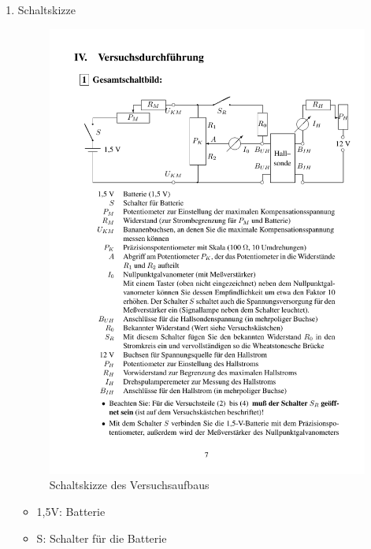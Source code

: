 \documentclass[12pt]{scrartcl}
\begin{document}
\begin{enumerate}
\item Schaltskizze \newline

\begin{figure}[htbp] 
	  \centering
	    \includegraphics[trim = 1mm 135mm 1mm 30mm, clip, scale = 1]{aufbau.pdf}
	  	\caption[Schaltskizze des Versuchsaufbaus]{Schaltskizze des Versuchsaufbaus\footnotemark}
	  \label{fig:aufbau}
	\end{figure}

\begin{itemize}
\item
1,5V: Batterie

\item
S: Schalter für die Batterie


\end{itemize}
\end{enumerate}
\end{document}
